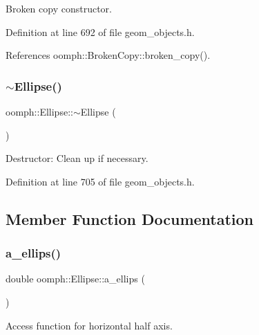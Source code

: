 Broken copy constructor. 



Definition at line 692 of file geom\+\_\+objects.\+h.



References oomph\+::\+Broken\+Copy\+::broken\+\_\+copy().

\mbox{\label{classoomph_1_1Ellipse_ac8b86537526fd611babf76e6df2271c7}} 
\subsubsection{\texorpdfstring{$\sim$\+Ellipse()}{~Ellipse()}}
{\footnotesize\ttfamily oomph\+::\+Ellipse\+::$\sim$\+Ellipse (\begin{DoxyParamCaption}{ }\end{DoxyParamCaption})\hspace{0.3cm}{\ttfamily [inline]}}



Destructor\+: Clean up if necessary. 



Definition at line 705 of file geom\+\_\+objects.\+h.



\subsection{Member Function Documentation}
\mbox{\label{classoomph_1_1Ellipse_ad97b84f6df7a6c11f093847f62c6a671}} 
\subsubsection{\texorpdfstring{a\+\_\+ellips()}{a\_ellips()}}
{\footnotesize\ttfamily double oomph\+::\+Ellipse\+::a\+\_\+ellips (\begin{DoxyParamCaption}{ }\end{DoxyParamCaption})\hspace{0.3cm}{\ttfamily [inline]}}



Access function for horizontal half axis. 



